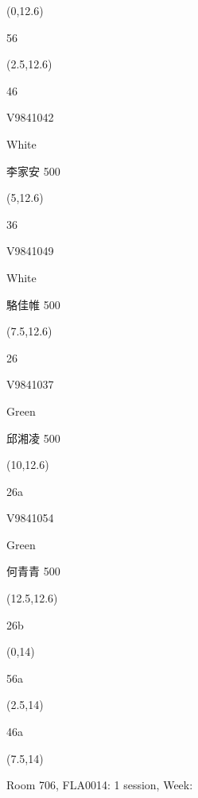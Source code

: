 \documentclass[a4paper]{article}
\newcommand{\myseat}[5]{%
\vspace{-0.1cm}
\parbox[t][2.2cm][t]{3.5cm}{
\small #1 %
\begin{description}
\vspace{-0.1cm}
\item [ID:] #2
\vspace{-0.1cm}
\item [Team:] #3 \normalsize
\vspace{-0.1cm}
\item \normalsize #4 #5
\vspace{-0.1cm}
\end{description}
}
}
\begin{document}
\begin{CJK}{UTF8}{cyberbit}
\begin{textblock}{2.5}(0,12.6)
\textblockcolor{}
\myseat{56}{}{}{}{}
\end{textblock}

\begin{textblock}{2.5}(2.5,12.6)
\myseat{46}{V9841042}{White}{李家安}{500}
\end{textblock}

\begin{textblock}{2.5}(5,12.6)
\myseat{36}{V9841049}{White}{駱佳帷}{500}
\end{textblock}

\begin{textblock}{2.5}(7.5,12.6)
\myseat{26}{V9841037}{Green}{邱湘凌}{500}
\end{textblock}

\begin{textblock}{2.5}(10,12.6)
\myseat{26a}{V9841054}{Green}{何青青}{500}
\end{textblock}

\begin{textblock}{2.5}(12.5,12.6)
\textblockcolor{}
\myseat{26b}{}{}{}{}
\end{textblock}

\begin{textblock}{2.5}(0,14)
\textblockcolor{}
\myseat{56a}{}{}{}{}
\end{textblock}

\begin{textblock}{2.5}(2.5,14)
\textblockcolor{}
\myseat{46a}{}{}{}{}
\end{textblock}

\begin{textblock}{7.5}(7.5,14)
\textblockcolor{}
\parbox[t][2.2cm][t]{9.5cm}{%
\large Room 706, FLA0014: 1 session, Week: 
}
\end{textblock}

\end{CJK}
\end{document}
